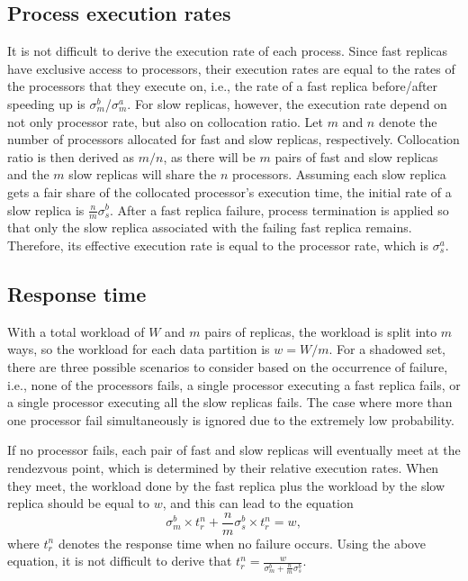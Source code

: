 \subsection{Process execution rates}
It is not difficult to derive the execution rate of each process. Since fast replicas have exclusive access to processors, their execution rates are equal to the rates of the processors that they execute on, i.e., the rate of a fast replica before/after speeding up is  $\sigma_{m}^{b}$/$\sigma_{m}^{a}$. For slow replicas, however, the execution rate depend on not only processor rate, but also on collocation ratio. Let $m$ and $n$ denote the number of processors allocated for fast and slow replicas, respectively. Collocation ratio is then derived as $m/n$, as there will be $m$ pairs of fast and slow replicas and the $m$ slow replicas will share the $n$ processors. Assuming each slow replica gets a fair share of the collocated processor's execution time, the initial rate of a slow replica is $\frac{n}{m}\sigma_{s}^{b}$. After a fast replica failure, process termination is applied so that only the slow replica associated with the failing fast replica remains. Therefore, its effective execution rate is equal to the processor rate, which is $\sigma_{s}^{a}$. 


\subsection{Response time}
\label{sec:res_time}
With a total workload of $W$ and $m$ pairs of replicas, the workload is split into $m$ ways, so the workload for each data partition is $w = W/m$.
For a shadowed set, there are three possible scenarios to consider based on the occurrence of failure, i.e., none of the processors fails, a single processor executing a fast replica fails, or a single processor executing all the slow replicas fails. The case where more than one processor fail simultaneously is ignored due to the extremely low probability.

If no processor fails, each pair of fast and slow replicas will eventually meet at the rendezvous point, which is determined by their relative execution rates. When they meet, the workload done by the fast replica plus the workload by the slow replica should be equal to $w$, and this can lead to the equation $$\sigma_m^b \times t_r^n + \frac{n}{m}\sigma_s^b \times t_r^n = w,$$ where $t_r^n$ denotes the response time when no failure occurs. Using the above equation, it is not difficult to derive that $t_r^n = \frac{w}{\sigma_m^b+\frac{n}{m}\sigma_s^b}$.

